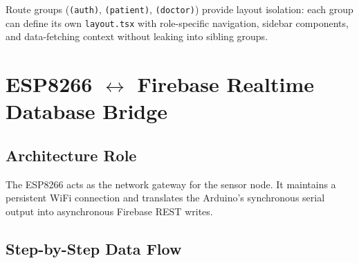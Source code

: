 \documentclass[12pt,a4paper]{report}
\begin{document}
Route groups (\texttt{(auth)}, \texttt{(patient)}, \texttt{(doctor)})
provide layout isolation: each group can define its own
\texttt{layout.tsx} with role-specific navigation, sidebar components,
and data-fetching context without leaking into sibling groups.

\section{ESP8266 $\leftrightarrow$ Firebase Realtime Database Bridge}
\label{sec:bridge}

\subsection{Architecture Role}

The ESP8266 acts as the network gateway for the sensor node. It
maintains a persistent WiFi connection and translates the Arduino's
synchronous serial output into asynchronous Firebase REST writes.

\subsection{Step-by-Step Data Flow}
\end{document}
